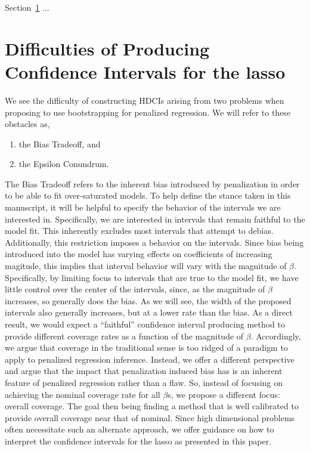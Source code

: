 Section~\ref{Sec:Difficulties} ...

\section{Difficulties of Producing Confidence Intervals for the lasso}\label{Sec:Difficulties}

We see the difficulty of constructing HDCIs arising from two problems when proposing to use bootstrapping for penalized regression. We will refer to these obstacles as,

\begin{enumerate}
\item the Bias Tradeoff, and
\item the Epsilon Conundrum.
\end{enumerate}

The Bias Tradeoff refers to the inherent bias introduced by penalization in order to be able to fit over-saturated models. To help define the stance taken in this manuscript, it will be helpful to specify the behavior of the intervals we are interested in. Specifically, we are interested in intervals that remain faithful to the model fit. This inherently excludes most intervals that attempt to debias. Additionally, this restriction imposes a behavior on the intervals. Since bias being introduced into the model has varying effects on coefficients of increasing magitude, this implies that interval behavior will vary with the magnitude of $\beta$. Specifically, by limiting focus to intervals that are true to the model fit, we have little control over the center of the intervals, since, as the magnitude of $\beta$ increases, so generally does the bias. As we will see, the width of the proposed intervals also generally increases, but at a lower rate than the bias. As a direct result, we would expect a ``faithful'' confidence interval producing method to provide different coverage rates as a function of the magnitude of $\beta$. Accordingly, we argue that coverage in the traditional sense is too ridged of a paradigm to apply to penalized regression inference. Instead, we offer a different perspective and argue that the impact that penalization induced bias has is an inherent feature of penalized regression rather than a flaw. So, instead of focusing on achieving the nominal coverage rate for all $\beta$s, we propose a different focus: overall coverage. The goal then being finding a method that is well calibrated to provide overall coverage near that of nominal. Since high dimensional problems often necessitate such an alternate approach, we offer guidance on how to interpret the confidence intervals for the lasso as presented in this paper.  

